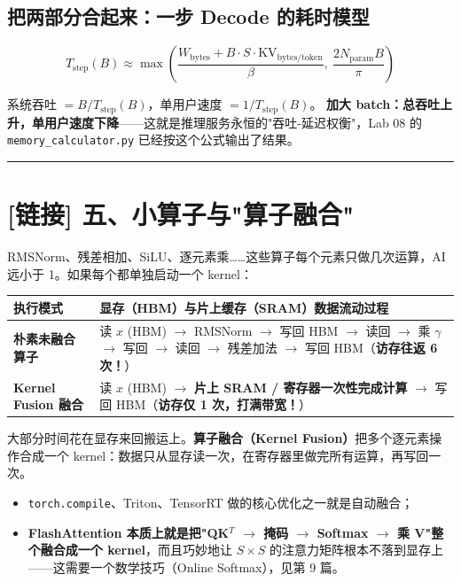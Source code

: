 \subsection{把两部分合起来：一步 Decode 的耗时模型}

\[
T_{\text{step}}(B) \approx \max\left( \frac{W_{\text{bytes}} + B \cdot S \cdot \text{KV}_{\text{bytes/token}}}{\beta}, \ \frac{2 N_{\text{param}} B}{\pi} \right)
\]

系统吞吐 $= B / T_{\text{step}}(B)$，单用户速度 $= 1 / T_{\text{step}}(B)$。
\textbf{加大 batch：总吞吐上升，单用户速度下降}——这就是推理服务永恒的"吞吐-延迟权衡"，Lab 08 的 \texttt{memory\_calculator.py} 已经按这个公式输出了结果。

\vspace{0.8em}\hrule\vspace{0.8em}

\section{[链接] 五、小算子与"算子融合"}

RMSNorm、残差相加、SiLU、逐元素乘\dots{}\dots{}这些算子每个元素只做几次运算，AI 远小于 1。如果每个都单独启动一个 kernel：

\begin{center}
\small
\begin{tabularx}{\textwidth}{p{2.8cm} X}
\toprule
\textbf{执行模式} & \textbf{显存（HBM）与片上缓存（SRAM）数据流动过程} \\
\midrule
\textbf{朴素未融合算子} & 读 $x$ (HBM) $\to$ RMSNorm $\to$ 写回 HBM $\to$ 读回 $\to$ 乘 $\gamma$ $\to$ 写回 $\to$ 读回 $\to$ 残差加法 $\to$ 写回 HBM（\textbf{访存往返 6 次！}） \\
\midrule
\textbf{Kernel Fusion 融合} & 读 $x$ (HBM) $\to$ \textbf{片上 SRAM / 寄存器一次性完成计算} $\to$ 写回 HBM（\textbf{访存仅 1 次，打满带宽！}） \\
\bottomrule
\end{tabularx}
\end{center}

大部分时间花在显存来回搬运上。\textbf{算子融合（Kernel Fusion）}把多个逐元素操作合成一个 kernel：数据只从显存读一次，在寄存器里做完所有运算，再写回一次。
\begin{itemize}
  \item \texttt{torch.compile}、Triton、TensorRT 做的核心优化之一就是自动融合；
  \item \textbf{FlashAttention 本质上就是把"QK$^T$ $\rightarrow$ 掩码 $\rightarrow$ Softmax $\rightarrow$ 乘 V"整个融合成一个 kernel}，而且巧妙地让 $S \times S$ 的注意力矩阵根本不落到显存上——这需要一个数学技巧（Online Softmax），见第 9 篇。
\end{itemize}

